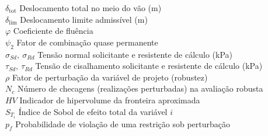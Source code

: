 \begin{tabbing}
$\delta_{\mathrm{tot}}$ \> Deslocamento total no meio do vão (m)\\
$\delta_{\mathrm{lim}}$ \> Deslocamento limite admissível (m)\\
$\varphi$ \> Coeficiente de fluência\\
$\psi_2$ \> Fator de combinação quase permanente\\
$\sigma_{Sd},\ \sigma_{Rd}$ \> Tensão normal solicitante e resistente de cálculo (kPa)\\
$\tau_{Sd},\ \tau_{Rd}$ \> Tensão de cisalhamento solicitante e resistente de cálculo (kPa)\\
$\rho$ \> Fator de perturbação da variável de projeto (robustez)\\
$N_c$ \> Número de checagens (realizações perturbadas) na avaliação robusta\\
$HV$ \> Indicador de hipervolume da fronteira aproximada\\
$S_{T_i}$ \> Índice de Sobol de efeito total da variável $i$\\
$p_f$ \> Probabilidade de violação de uma restrição sob perturbação
\end{tabbing}
